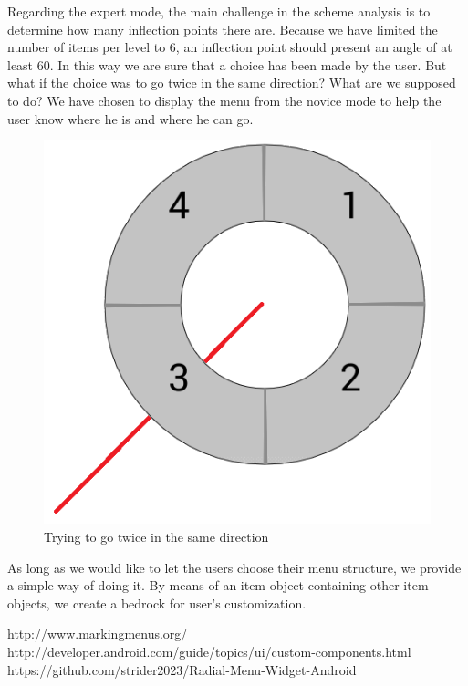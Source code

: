 \documentclass[conference]{IEEEtran}
\begin{document}
Regarding the expert mode, the main challenge in the scheme analysis is to determine how many inflection points there are. Because we have limited the number of items per level to 6, an inflection point should present an angle of at least 60. In this way we are sure that a choice has been made by the user. But what if the choice was to go twice in the same direction? What are we supposed to do? We have chosen to display the menu from the novice mode to help the user know where he is and where he can go.

\begin{figure}[!ht] 
		\centering
		\includegraphics[scale = 0.5]{figure6.png} %
		\caption{Trying to go twice in the same direction}
		\label{linear-marking_menus}
\end{figure}

As long as we would like to let the users choose their menu structure, we provide a simple way of doing it. By means of an item object containing other item objects, we create a bedrock for user's customization.\\

\begin{thebibliography}{}
http://www.markingmenus.org/
http://developer.android.com/guide/topics/ui/custom-components.html
https://github.com/strider2023/Radial-Menu-Widget-Android

\end{thebibliography}
\end{document}
